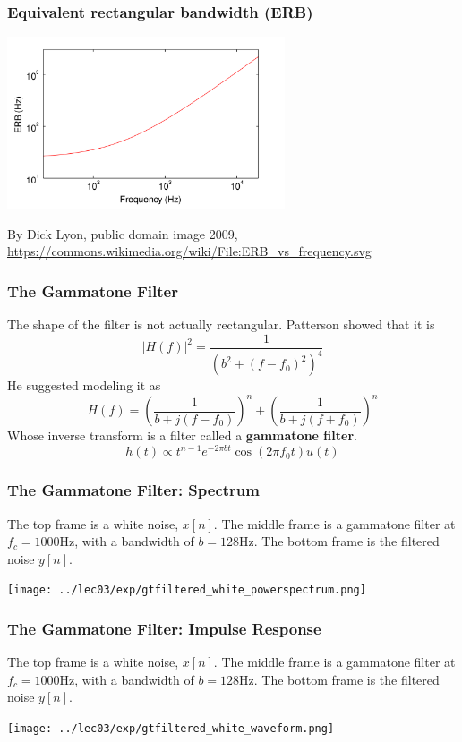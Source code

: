 \documentclass{beamer}
\begin{document}
\begin{frame}
  \frametitle{Equivalent rectangular bandwidth (ERB)}

  \centerline{\includegraphics[height=2in]{../lec04/2560px-ERB_vs_frequency.png}}
  \begin{tiny}
    By Dick Lyon, public domain image 2009,
    \url{https://commons.wikimedia.org/wiki/File:ERB_vs_frequency.svg}
  \end{tiny}
\end{frame}

\begin{frame}
  \frametitle{The Gammatone Filter}

  The shape of the filter is not actually rectangular.  Patterson showed that it is
  \[
  |H(f)|^2 = \frac{1}{(b^2+(f-f_0)^2)^4}
  \]  
  He suggested modeling it as
  \[
  H(f) = \left(\frac{1}{b + j(f-f_0)}\right)^n + \left(\frac{1}{b + j(f+f_0)}\right)^n
  \]
  Whose inverse transform is a filter called a {\bf gammatone filter}.
  \[
  h(t) \propto t^{n-1} e^{-2\pi bt}\cos(2\pi f_0 t)u(t)
  \]
\end{frame}

\begin{frame}
  \frametitle{The Gammatone Filter: Spectrum}

  The top frame is a white noise, $x[n]$.  The middle frame is a
  gammatone filter at $f_c=1000$Hz, with a bandwidth of $b=128$Hz.
  The bottom frame is the filtered noise $y[n]$.

  \centerline{\texttt{[image: ../lec03/exp/gtfiltered\_white\_powerspectrum.png]}}
\end{frame}
  
\begin{frame}
  \frametitle{The Gammatone Filter: Impulse Response}

  The top frame is a white noise, $x[n]$.  The middle frame is a
  gammatone filter at $f_c=1000$Hz, with a bandwidth of $b=128$Hz.
  The bottom frame is the filtered noise $y[n]$.

  \centerline{\texttt{[image: ../lec03/exp/gtfiltered\_white\_waveform.png]}}
\end{frame}
\end{document}
